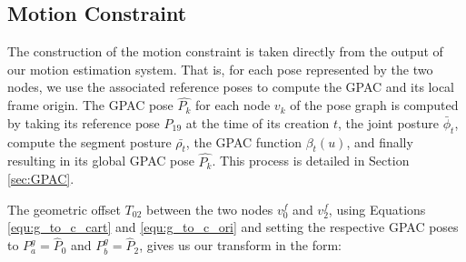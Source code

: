 \subsection{Motion Constraint}

The construction of the motion constraint is taken directly from the output of our motion estimation system.  That is, for each pose represented by the two nodes, we use the associated reference poses to compute the GPAC and its local frame origin.   The GPAC pose $\hat{P_k}$ for each node $v_k$ of the pose graph is computed by taking its reference pose $P_{19}$ at the time of its creation $t$, the joint posture $\bar{\phi}_t$, compute the segment posture $\bar{\rho_t}$, the GPAC function $\beta_t(u)$, and finally resulting in its global GPAC pose $\hat{P_k}$.  This process is detailed in Section \ref{sec:GPAC}.

The geometric offset $T_{02}$ between the two nodes $v^f_0$ and $v^f_2$, using Equations \ref{equ:g_to_c_cart} and \ref{equ:g_to_c_ori} and setting the respective GPAC poses to $P^g_a = \hat{P}_0$ and $P^g_b = \hat{P}_2$, gives us our transform in the form:


